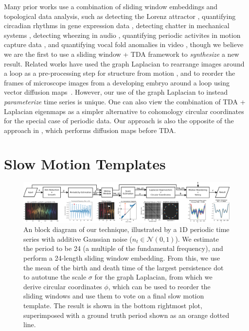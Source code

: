 \documentclass{article}
\begin{document}
Many prior works use a combination of sliding window embeddings and topological data analysis, such as detecting the Lorenz attractor \cite{de2012topological}, quantifying circadian rhythms in gene expression data \cite{perea2015sliding}, detecting chatter in mechanical systems \cite{khasawneh2016chatter}, detecting wheezing in audio \cite{emrani2014real}, quantifying periodic activites in motion capture data \cite{vejdemo2015cohomological, venkataraman2016persistent}, and quantifying vocal fold anomalies in video \cite{tralie2017quasi}, though we believe we are the first to use a sliding window + TDA framework to {\em synthesize} a new result. Related works have used the graph Laplacian to rearrange images around a loop as a pre-processing step for structure from motion \cite{averbuch2015ringit}, and to reorder the frames of microscope images from a developing embryo around a loop using vector diffusion maps~\cite{dsilva2015diffusionvecordering}.  However, our use of the graph Laplacian to instead {\em parameterize} time series is unique. One can also view the combination of TDA + Laplacian eigenmaps as a simpler alternative to cohomology circular coordinates \cite{de2011persistent,vejdemo2015cohomological} for the special case of periodic data.  Our approach is also the opposite of the approach in \cite{bendich2011improving}, which performs diffusion maps before TDA.


\section{Slow Motion Templates}
\label{sec:methods}

\begin{figure}[h!]
\centering
\includegraphics[width=\textwidth]{BlockDiagram.pdf}
\caption{An block diagram of our technique, illustrated by a 1D periodic time series with additive Gaussian noise ($n_t \in \mathcal{N}(0, 1)$).  We estimate the period to be 24 (a multiple of the fundamental frequency), and perform a 24-length sliding window embedding.  From this, we use the mean of the birth and death time of the largest persistence dot to autotune the scale $\sigma$ for the graph Laplacian, from which we derive circular coordinates $\phi$, which can be used to reorder the sliding windows and use them to vote on a final slow motion template.  The result is shown in the bottom rightmost plot, superimposed with a ground truth period shown as an orange dotted line.}
\label{fig:ConceptFigure}
\end{figure}
\end{document}
